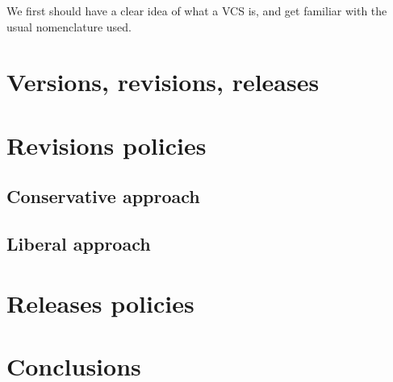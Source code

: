 \documentclass[a4paper,10pt]{article}
\begin{document}
We first should have a clear idea of what a VCS is, and get familiar
with the usual nomenclature used.

\section{Versions, revisions, releases}


\section{Revisions policies}

\subsection{Conservative approach}

\subsection{Liberal approach}

\section{Releases policies}

\section{Conclusions}


\tableofcontents
\end{document}
